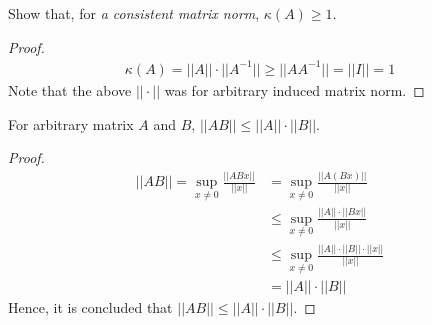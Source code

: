 \documentclass[11pt,a4paper]{article}
\begin{document}
\begin{titlepage}
    \maketitle
\end{titlepage}
\begin{center} 
    \tableofcontents  
%
\end{center}
\newpage
\section{}
Show that, for {\it a consistent matrix norm}, $\kappa(A) \geq 1$.

\begin{proof}
\begin{align}
    \kappa(A) = ||A|| \cdot ||A^{-1}|| \geq || A A^{-1}|| = ||I|| = 1
\end{align}
Note that the above $||\cdot||$ was for arbitrary induced matrix norm.
\end{proof}

\begin{lemma}
    For arbitrary matrix $A$ and $B$, $|| AB || \leq || A || \cdot || B ||$.
\end{lemma}
\begin{proof}
    \begin{align}
        || A B || = \sup_{x \not =0} \frac{|| A B x ||}{|| x ||} 
        &= \sup_{x \not =0} \frac{|| A (B x) ||}{|| x ||} \\ 
        &\leq \sup_{x \not =0} \frac{|| A || \cdot || B x ||}{|| x ||} \\
        &\leq \sup_{x \not =0} \frac{|| A || \cdot || B || \cdot || x || }{|| x ||} \\
        &= || A || \cdot || B || 
\end{align}
Hence, it is concluded that $|| A B || \leq || A || \cdot || B ||$.
\end{proof}
\end{document}
